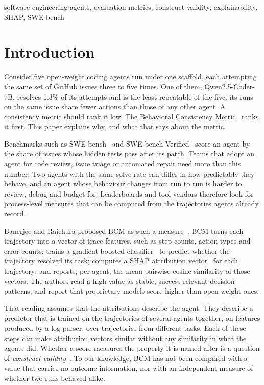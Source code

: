 \documentclass[conference]{IEEEtran}
\newcommand{\bcm}{\textsc{BCM}}
\begin{document}
\begin{IEEEkeywords}
software engineering agents, evaluation metrics, construct validity, explainability, SHAP, SWE-bench
\end{IEEEkeywords}

\section{Introduction}
\label{sec:intro}
Consider five open-weight coding agents run under one scaffold, each attempting the same set of GitHub issues three to five times. One of them, Qwen2.5-Coder-7B, resolves 1.3\% of its attempts and is the least repeatable of the five: its runs on the same issue share fewer actions than those of any other agent. A consistency metric should rank it low. The Behavioral Consistency Metric~\cite{raichura2026bcm} ranks it first. This paper explains why, and what that says about the metric.

Benchmarks such as SWE-bench~\cite{jimenez2024swebench} and SWE-bench Verified~\cite{openai2024verified} score an agent by the share of issues whose hidden tests pass after its patch. Teams that adopt an agent for code review, issue triage or automated repair need more than this number. Two agents with the same solve rate can differ in how predictably they behave, and an agent whose behaviour changes from run to run is harder to review, debug and budget for. Leaderboards and tool vendors therefore look for process-level measures that can be computed from the trajectories agents already record.

Banerjee and Raichura proposed \bcm{} as such a measure~\cite{raichura2026bcm}. \bcm{} turns each trajectory into a vector of trace features, such as step counts, action types and error counts; trains a gradient-boosted classifier~\cite{ke2017lightgbm} to predict whether the trajectory resolved its task; computes a SHAP attribution vector~\cite{lundberg2017shap,lundberg2020treeshap} for each trajectory; and reports, per agent, the mean pairwise cosine similarity of those vectors. The authors read a high value as stable, success-relevant decision patterns, and report that proprietary models score higher than open-weight ones.

That reading assumes that the attributions describe the agent. They describe a predictor that is trained on the trajectories of several agents together, on features produced by a log parser, over trajectories from different tasks. Each of these steps can make attribution vectors similar without any similarity in what the agents did. Whether a score measures the property it is named after is a question of \emph{construct validity}~\cite{cronbach1955construct,messick1995validity}. To our knowledge, \bcm{} has not been compared with a value that carries no outcome information, nor with an independent measure of whether two runs behaved alike.
\end{document}
